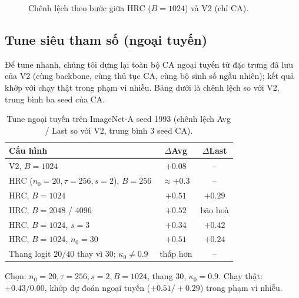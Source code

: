 \documentclass[11pt]{article}
\begin{document}
\begin{figure}[H]
\centering
{}
\caption{Chênh lệch theo bước giữa HRC ($B=1024$) và V2 (chỉ CA).}
\end{figure}

\subsection{Tune siêu tham số (ngoại tuyến)}
Để tune nhanh, chúng tôi dựng lại toàn bộ CA ngoại tuyến từ đặc trưng đã lưu của V2 (cùng backbone, cùng thủ tục CA,
cùng bộ sinh số ngẫu nhiên); kết quả khớp với chạy thật trong phạm vi nhiễu. Bảng dưới là chênh lệch so với V2, trung
bình ba seed của CA.

\begin{table}[H]
\centering\small
\caption{Tune ngoại tuyến trên ImageNet-A seed 1993 (chênh lệch Avg / Last so với V2, trung bình 3 seed CA).}
\begin{tabular}{lcc}
\toprule
Cấu hình & $\Delta$Avg & $\Delta$Last\\
\midrule
V2, $B=1024$ & $+0.08$ & --\\
HRC ($n_0{=}20,\tau{=}256,s{=}2$), $B=256$ & $\approx+0.3$ & --\\
HRC, $B=1024$ & $+0.51$ & $+0.29$\\
HRC, $B=2048$ / $4096$ & $+0.52$ & bão hoà\\
HRC, $B=1024$, $s=3$ & $+0.34$ & $+0.42$\\
HRC, $B=1024$, $n_0=30$ & $+0.51$ & $+0.24$\\
Thang logit $20/40$ thay vì $30$; $\kappa_0\ne0.9$ & thấp hơn & --\\
\bottomrule
\end{tabular}
\end{table}
Chọn: $n_0=20,\tau=256,s=2,B=1024$, thang 30, $\kappa_0=0.9$. Chạy thật: $+0.43/0.00$, khớp dự đoán ngoại tuyến
($+0.51/+0.29$) trong phạm vi nhiễu.

\end{document}

